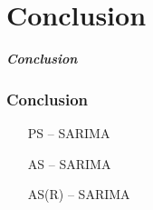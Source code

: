 \documentclass{beamer}
\begin{document}
\section{Conclusion}

\begin{frame}
	\begin{center}
		\Huge \textbf{\textit{Conclusion}}
	\end{center}
\end{frame}

\begin{frame}
  \frametitle{Conclusion}

  \begin{itemize}
    \item [PS] – SARIMA
    \item [AS] – SARIMA
    \item [AS(R)] – SARIMA
  \end{itemize}
\end{frame}
\end{document}
